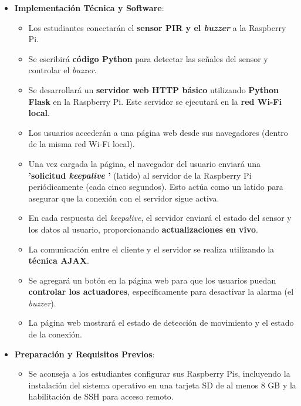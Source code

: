 \documentclass{report}
\begin{document}
\begin{itemize}
    \item \textbf{Implementación Técnica y Software}:
    \begin{itemize}
        \item Los estudiantes conectarán el \textbf{sensor PIR y el \textit{buzzer}} a la Raspberry Pi.
        \item Se escribirá \textbf{código Python} para detectar las señales del sensor y controlar el \textit{buzzer}.
        \item Se desarrollará un \textbf{servidor web HTTP básico} utilizando \textbf{Python Flask} en la Raspberry Pi. Este servidor se ejecutará en la 
        \textbf{red Wi-Fi local}.
        \item Los usuarios accederán a una página web desde sus navegadores (dentro de la misma red Wi-Fi local).
        \item Una vez cargada la página, el navegador del usuario enviará una \textbf{ 'solicitud \textit{keepalive} '} (latido) al servidor de la 
        Raspberry Pi periódicamente (cada cinco segundos). Esto actúa como un latido para asegurar que la conexión con el servidor sigue activa.
        \item En cada respuesta del \textit{keepalive}, el servidor enviará el estado del sensor y los datos al usuario, proporcionando 
        \textbf{actualizaciones en vivo}.
        \item La comunicación entre el cliente y el servidor se realiza utilizando la \textbf{técnica AJAX}.
        \item Se agregará un botón en la página web para que los usuarios puedan \textbf{controlar los actuadores}, específicamente para desactivar 
        la alarma (el \textit{buzzer}).
        \item La página web mostrará el estado de detección de movimiento y el estado de la conexión.
    \end{itemize}
    
    \item \textbf{Preparación y Requisitos Previos}:
    \begin{itemize}
        \item Se aconseja a los estudiantes configurar sus Raspberry Pis, incluyendo la instalación del sistema operativo en una tarjeta SD de al menos 
        8 GB y la habilitación de SSH para acceso remoto.
    \end{itemize}


\end{itemize}
\end{document}
